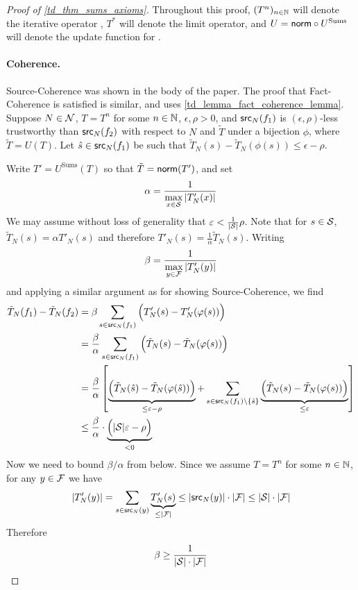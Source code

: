 \begin{proof}[Proof of \cref{td_thm_sums_axioms}]

Throughout this proof, $(T^n)_{n \in \Nat}$ will denote the iterative operator
\sums{}, $T^*$ will denote the limit operator, and $U = \norm \circ
U^{\text{Sums}}$ will denote the update function for \sums{}.

\paragraph{Coherence.} Source-Coherence was shown in the body of the paper.
The proof that Fact-Coherence is satisfied is similar, and uses
\cref{td_lemma_fact_coherence_lemma}. Suppose $N \in \N$, $T = T^n$ for some $n
\in \Nat$, $\epsilon, \rho > 0$, and $\src_N(f_1)$ is $(\epsilon, \rho)$-less
trustworthy than $\src_N(f_2)$ with respect to $N$ and $\tilde{T}$ under a
bijection $\phi$, where $\tilde{T} = U(T)$. Let $\hat{s} \in \src_N(f_1)$ be
such that $\tilde{T}_N(s) - \tilde{T}_N(\phi(s)) \le \epsilon - \rho$.

Write $T' = U^{\text{Sums}}(T)$ so that $\tilde{T} = \norm(T')$, and set
\[
    \alpha = \frac{1}{\max\limits_{x \in \S}{|T'_N(x)|}}
\]
We may assume without loss of generality that $\epsilon < \frac{1}{|\S|}\rho$.
Note that for $s \in \S$, $\tilde{T}_N(s) = {\alpha}T'_N(s)$ and therefore
$T'_N(s) = \frac{1}{\alpha}\tilde{T}_N(s)$. Writing
\[
    \beta = \frac{1}{\max\limits_{y \in \F}{|T'_N(y)|}}
\]
and applying a similar argument as for showing Source-Coherence, we find
\begin{align*}
    \tilde{T}_N(f_1) - \tilde{T}_N(f_2)
    &= \beta \sum_{s \in \src_N(f_1)}{ \Big(
        T'_N(s) - T'_N(\phi(s))
    \Big) } \\
    &= \frac{\beta}{\alpha} \sum_{s \in \src_N(f_1)}{ \Big(
        \tilde{T}_N(s) - \tilde{T}_N(\phi(s))
    \Big) } \\
    &= \frac{\beta}{\alpha} \left[
        \underbrace{
            \Big(
                \tilde{T}_N(\hat{s}) - \tilde{T}_N(\phi(\hat{s}))
            \Big)
        }_{\le \epsilon - \rho}
        +
        \sum_{s \in \src_N(f_1) \setminus \{\hat{s}\} }{
            \underbrace{
                \Big(
                    \tilde{T}_N(s) - \tilde{T}_N(\phi(s))
                \Big)
            }_{\le \epsilon}
        }
    \right] \\
    & \le \frac{\beta}{\alpha}
      \cdot
      \underbrace{
          \Big(|\S|\epsilon - \rho \Big)
      }_{< 0}
\end{align*}
Now we need to bound $\beta / \alpha$ from below. Since we assume $T =
T^n$ for some $n \in \Nat$, for any $y \in \F$ we have
\[
    |T'_N(y)| =
        \sum_{s \in \src_N(y)}{
            \underbrace{T'_N(s)}_{\le |\F|}
        }
    \le |\src_N(y)| \cdot |\F|
    \le |\S| \cdot |\F|
\]
Therefore
\[
    \beta \ge \frac{1}{|\S| \cdot |\F|}
\]


\end{proof}
